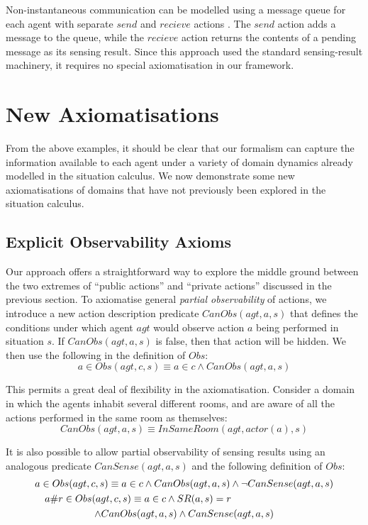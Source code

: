Non-instantaneous communication can be modelled using a message queue
for each agent with separate $send$ and $recieve$ actions \citep{Lesperance99sitcalc_approach}.
The $send$ action adds a message to the queue, while the $recieve$
action returns the contents of a pending message as its sensing result.
Since this approach used the standard sensing-result machinery, it
requires no special axiomatisation in our framework.


\section{New Axiomatisations\label{sec:Observations:Axiomatising-extended}}

From the above examples, it should be clear that our formalism can
capture the information available to each agent under a variety of
domain dynamics already modelled in the situation calculus. We now
demonstrate some new axiomatisations of domains that have not previously
been explored in the situation calculus.


\subsection{Explicit Observability Axioms\label{sec:Observations:CanObs}}

Our approach offers a straightforward way to explore the middle ground
between the two extremes of {}``public actions'' and {}``private
actions'' discussed in the previous section. To axiomatise general
\emph{partial observability} of actions, we introduce a new action
description predicate $CanObs(agt,a,s)$ that defines the conditions
under which agent $agt$ would observe action $a$ being performed
in situation $s$. If $CanObs(agt,a,s)$ is false, then that action
will be hidden. We then use the following in the definition of $Obs$:\[
a\in Obs(agt,c,s)\equiv a\in c\wedge CanObs(agt,a,s)\]


This permits a great deal of flexibility in the axiomatisation. Consider
a domain in which the agents inhabit several different rooms, and
are aware of all the actions performed in the same room as themselves:\[
CanObs(agt,a,s)\equiv InSameRoom(agt,actor(a),s)\]


It is also possible to allow partial observability of sensing results
using an analogous predicate $CanSense(agt,a,s)$ and the following
definition of $Obs$:\begin{multline*}
a\in Obs(agt,c,s)\equiv a\in c\wedge CanObs(agt,a,s)\wedge\neg CanSense(agt,a,s)\\
\shoveleft{a\#r\in Obs(agt,c,s)\equiv a\in c\wedge SR(a,s)=r}\\
\wedge CanObs(agt,a,s)\wedge CanSense(agt,a,s)\end{multline*}



